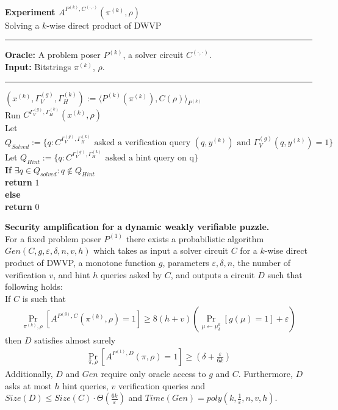 \begin{codeblock}
  \textbf{Experiment $A^{P^{(k)}, C^{(\cdot, \cdot)}}(\pi^{(k)}, \rho)$}\\
  Solving a $k$-wise direct product of DWVP
  \medskip
  \hrule
  \medskip
  \textbf{Oracle:} A problem poser $P^{(k)}$, a solver circuit $C^{(\cdot,\cdot)}$.\\
  \textbf{Input:}  Bitstrings $\pi^{(k)}$, $\rho$.
  \medskip\hrule\medskip
  $(x^{(k)}, \Gamma_V^{(g)}, \Gamma_H^{(k)}) := \langle P^{(k)}(\pi^{(k)}), C(\rho) \rangle_{P^{(k)}}$ \\
  Run $C^{\Gamma_V^{(g)},\Gamma_H^{(k)}}(x^{(k)}, \rho)$ \\
  \IndI Let $Q_{Solved} := \{q: \text{$C^{\Gamma_V^{(g)}, \Gamma_H^{(k)}}$ asked a verification query $(q,y^{(k)})$ and $\Gamma_V^{(g)}(q, y^{(k)}) = 1$} \}$\\
  \IndI Let $Q_{Hint} := \{q: \text{$C^{\Gamma_V^{(g)}, \Gamma_H^{(k)}}$ asked a hint query on q} \}$\\
  \textbf{If} $\exists q \in Q_{solved} : q \notin Q_{Hint}$ \then \\
  \IndI \textbf{return} $1$\\
  \textbf{else} \\
  \IndI \textbf{return} $0$\\
\end{codeblock}
%
\begin{theorem}{\textbf{Security amplification for a dynamic weakly verifiable puzzle.}}
\label{th:sec_amp_for_dwvp}\\
For a fixed problem poser $P^{(1)}$ there exists a probabilistic algorithm $Gen(C, g, \varepsilon, \delta, n, v, h)$ which takes as input a solver circuit $C$ for a $k$-wise
direct product of DWVP, a monotone function $g$, parameters $\varepsilon, \delta,n$, the number of verification $v$, and hint $h$ queries asked by $C$, and outputs a circuit $D$
such that following holds: \\
If $C$ is such that \\
  \begin{align*}
    \underset{\pi^{(k)}, \rho }{\Pr}[A^{P^{(g)}, C}(\pi^{(k)}, \rho) = 1]
    \geq 8(h+v) \left(\underset{\mu \leftarrow \mu_\delta^k}{\Pr}[g(\mu) = 1] + \varepsilon\right)
  \end{align*}
then $D$ satisfies almost surely
  \begin{align*}
    \underset{\pi, \rho}{\Pr}[A^{P^{(1)},D}(\pi, \rho) = 1] \geq (\delta + \frac{\varepsilon}{6k})
  \end{align*}
Additionally, $D$ and $Gen$ require only oracle access to $g$ and $C$. Furthermore, $D$ asks at most $h$ hint queries, $v$ verification queries and
$Size(D) \leq Size(C) \cdot \Theta(\frac{6k}{\varepsilon})$ and $Time(Gen) = poly(k, \frac{1}{\varepsilon}, n, v, h)$.
\end{theorem}
